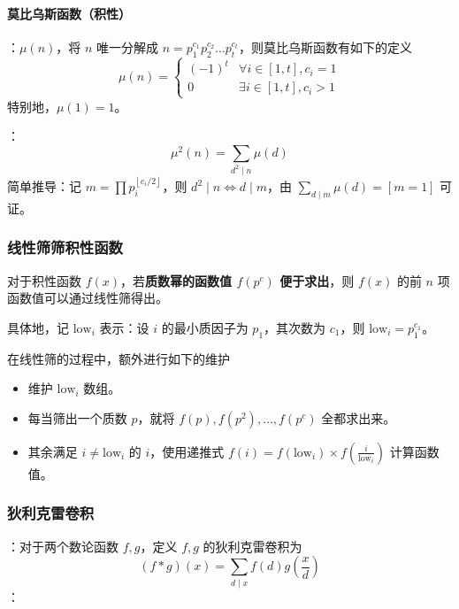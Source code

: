 \paragraph{莫比乌斯函数（积性）}

：$\mu(n)$，将 $n$ 唯一分解成 $n = p_1^{c_1}p_2^{c_2}\dots p_t^{c_t}$，则莫比乌斯函数有如下的定义
\[
\mu(n) = \begin{cases}
(-1)^t & \forall i\in[1, t], c_i = 1 \\
0 & \exists i\in[1, t], c_i > 1
\end{cases}
\]
特别地，$\mu(1) = 1$。

：
\[
\mu^2(n) = \sum_{d^2 \mid n} \mu(d)
\]
简单推导：记 $m = \prod p_i^{\left\lfloor c_i / 2 \right\rfloor}$，则 $d^2 \mid n \iff d \mid m$，由 $\sum_{d \mid m}\mu(d) = [m = 1]$ 可证。

\subsubsection{线性筛筛积性函数}

对于积性函数 $f(x)$，若\textbf{质数幂的函数值 $f(p^c)$ 便于求出}，则 $f(x)$ 的前 $n$ 项函数值可以通过线性筛得出。

具体地，记 $\mathrm{low}_i$ 表示：设 $i$ 的最小质因子为 $p_1$，其次数为 $c_1$，则 $\mathrm{low}_i = p_1^{c_1}$。

在线性筛的过程中，额外进行如下的维护

\begin{itemize}
    \item 维护 $\mathrm{low}_i$ 数组。
    \item 每当筛出一个质数 $p$，就将 $f(p), f(p^2), \dots, f(p^c)$ 全都求出来。
    \item 其余满足 $i \neq\mathrm{low}_i$ 的 $i$，使用递推式 $f(i) = f(\mathrm{low}_i) \times f\left(\frac{i}{\mathrm{low}_i}\right)$ 计算函数值。
\end{itemize}


\subsubsection{狄利克雷卷积}

：对于两个数论函数 $f, g$，定义 $f, g$ 的狄利克雷卷积为
\[
(f \ast g)(x) = \sum_{d \mid x} f(d)g\left( \frac{x}{d} \right)
\]
：

